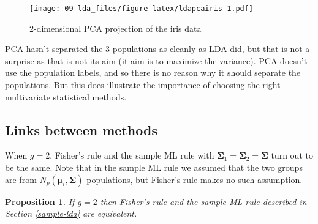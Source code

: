 \documentclass[
]{book}
\newenvironment{Shaded}{\begin{snugshade}}{\end{snugshade}}
\newcommand{\AttributeTok}[1]{\textcolor[rgb]{0.13,0.29,0.53}{#1}}
\newcommand{\DecValTok}[1]{\textcolor[rgb]{0.00,0.00,0.81}{#1}}
\newcommand{\FunctionTok}[1]{\textcolor[rgb]{0.13,0.29,0.53}{\textbf{#1}}}
\newcommand{\NormalTok}[1]{#1}
\newcommand{\OtherTok}[1]{\textcolor[rgb]{0.56,0.35,0.01}{#1}}
\newcommand{\SpecialCharTok}[1]{\textcolor[rgb]{0.81,0.36,0.00}{\textbf{#1}}}
\newtheorem{proposition}{Proposition}[chapter]
\theoremstyle{definition}
\theoremstyle{definition}
\theoremstyle{definition}
\theoremstyle{definition}
\theoremstyle{remark}
\begin{document}
\begin{Shaded}
\end{Shaded}

\begin{figure}
\centering
\texttt{[image: 09-lda\_files/figure-latex/ldapcairis-1.pdf]}
\caption{\label{fig:ldapcairis}2-dimensional PCA projection of the iris data}
\end{figure}

PCA hasn't separated the 3 populations as cleanly as LDA did, but that is not a surprise as that is not its aim (it aim is to maximize the variance). PCA doesn't use the population labels, and so there is no reason why it should separate the populations. But this does illustrate the importance of choosing the right multivariate statistical methods.

\subsection{Links between methods}\label{links-between-methods}

When \(g=2\), Fisher's rule and the sample ML rule with \(\boldsymbol{\Sigma}_1=\boldsymbol{\Sigma}_2=\boldsymbol{\Sigma}\) turn out to be the same. Note that in
the sample ML rule we assumed that the two groups are from \(N_p({\boldsymbol{\mu}}_i, \boldsymbol{\Sigma})\)
populations, but Fisher's rule makes no such assumption.

\begin{proposition}
\protect\hypertarget{prp:nine3}{}\label{prp:nine3}If \(g=2\) then Fisher's rule and the sample ML rule described in Section \ref{sample-lda} are equivalent.
\end{proposition}
\end{document}
